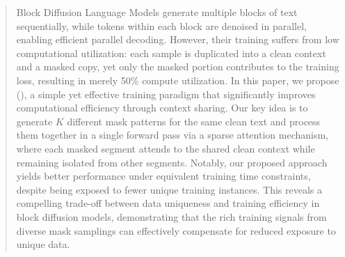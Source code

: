 \begin{abstract}
  Block Diffusion Language Models generate multiple blocks of text sequentially, while tokens within each block are denoised in parallel, enabling efficient parallel decoding.
  However, their training suffers from low computational utilization: each sample is duplicated into a clean context and a masked copy, yet only the masked portion contributes to the training loss, resulting in merely 50\% compute utilization.
  In this paper, we propose \textbf{\NAME{}} (\textbf{\name{}}), a simple yet effective training paradigm that significantly improves computational efficiency through context sharing.
  Our key idea is to generate $K$ different mask patterns for the same clean text and process them together in a single forward pass via a sparse attention mechanism, where each masked segment attends to the shared clean context while remaining isolated from other segments.
  Notably, our proposed approach yields better performance under equivalent training time constraints, despite being exposed to fewer unique training instances.
  This reveals a compelling trade-off between data uniqueness and training efficiency in block diffusion models, demonstrating that the rich training signals from diverse mask samplings can effectively compensate for reduced exposure to unique data.
\end{abstract}
